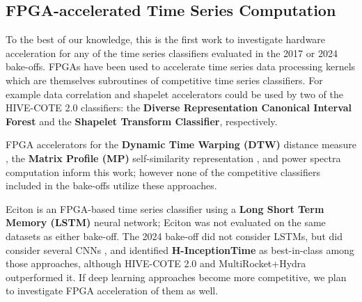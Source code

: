 \subsection{FPGA-accelerated Time Series Computation}
\label{sec:fpga_time_series}

To the best of our knowledge, this is the first work to investigate hardware acceleration for any of the time series classifiers evaluated in the 2017 or 2024 bake-offs. FPGAs have been used to accelerate time series data processing kernels which are themselves subroutines of competitive time series classifiers. For example data correlation \cite{ChiosaAMNES} and shapelet \cite{CostaShapelet, LiuShapelet} accelerators could be used by two of the HIVE-COTE 2.0 classifiers: the \textbf{Diverse Representation Canonical Interval Forest} and the \textbf{Shapelet Transform Classifier}, respectively. 

FPGA accelerators for the \textbf{Dynamic Time Warping (DTW)} distance measure \cite{SartDTW, WangDTW}, the \textbf{Matrix Profile (MP)} self-similarity representation \cite{RomeroMP, KalantarLAMP}, and power spectra computation  \cite{SpectralAnomalyDetection} inform this work; however none of the competitive classifiers included in the bake-offs utilize these approaches. 

Eciton \cite{Eciton} is an FPGA-based time series classifier using a \textbf{Long Short Term Memory (LSTM)} neural network; Eciton was not evaluated on the same datasets as either bake-off. The 2024 bake-off did not consider LSTMs, but did consider several CNNs \cite{InceptionTime, H-InceptionTime, LiteTime}, and identified \textbf{H-InceptionTime}  \cite{H-InceptionTime} as best-in-class among those approaches, although HIVE-COTE 2.0 and MultiRocket+Hydra outperformed it. If deep learning approaches become more competitive, we plan to investigate FPGA acceleration of them as well.

